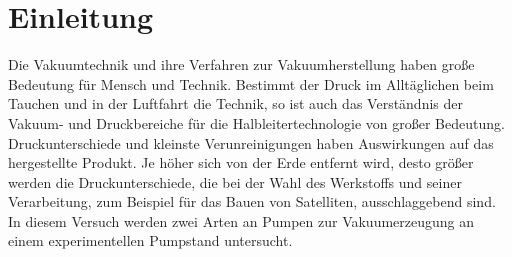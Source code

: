\section{Einleitung}
Die Vakuumtechnik und ihre Verfahren zur Vakuumherstellung haben große Bedeutung für Mensch und Technik.
Bestimmt der Druck im Alltäglichen beim Tauchen und in der Luftfahrt die Technik, so ist auch das Verständnis der Vakuum- und Druckbereiche
für die Halbleitertechnologie von großer Bedeutung.
Druckunterschiede und kleinste Verunreinigungen haben Auswirkungen auf das hergestellte Produkt.
Je höher sich von der Erde entfernt wird, desto größer werden die Druckunterschiede, die bei der Wahl des Werkstoffs und seiner Verarbeitung,
zum Beispiel für das Bauen von Satelliten, ausschlaggebend sind.
In diesem Versuch werden zwei Arten an Pumpen zur Vakuumerzeugung an einem experimentellen Pumpstand untersucht.
